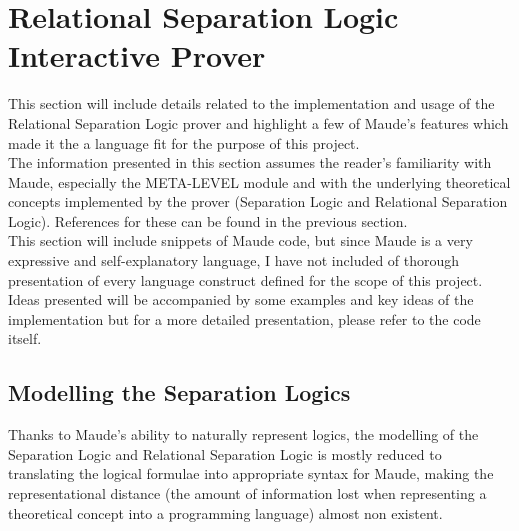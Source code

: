 \documentclass[12pt,a4paper]{article}
\begin{document}
\section{Relational Separation Logic Interactive Prover} 
This section will include details related to the implementation and usage of the Relational Separation Logic prover and highlight a few of Maude's features which made it the a language fit for the purpose of this project.
\\

The information presented in this section assumes the reader's familiarity with Maude, especially the META-LEVEL module and with the underlying theoretical concepts implemented by the prover (Separation Logic and Relational Separation Logic). References for these can be found in the previous section.
\\

This section will include snippets of Maude code, but since Maude is a very expressive and self-explanatory language, I have not included of thorough presentation of every language construct defined for the scope of this project. Ideas presented will be accompanied by some examples and key ideas of the implementation but for a more detailed presentation, please refer to the code itself.
 
\subsection{Modelling the Separation Logics}
Thanks to Maude's ability to naturally represent logics, the modelling of the Separation Logic and Relational Separation Logic is mostly reduced to translating the logical formulae into appropriate syntax for Maude, making the representational distance (the amount of information lost when representing a theoretical concept into a programming language)\cite{manual} almost non existent. \\
\end{document}
